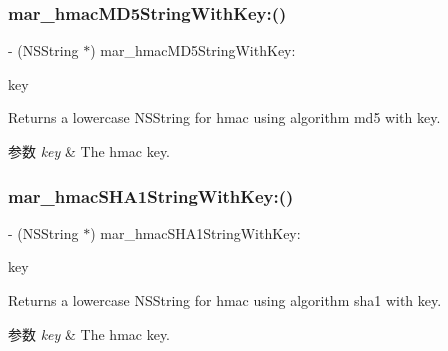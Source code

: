 \subsubsection{\texorpdfstring{mar\+\_\+hmac\+M\+D5\+String\+With\+Key\+:()}{mar\_hmacMD5StringWithKey:()}}
{\footnotesize\ttfamily -\/ (N\+S\+String $\ast$) mar\+\_\+hmac\+M\+D5\+String\+With\+Key\+: \begin{DoxyParamCaption}\item[{(N\+S\+String $\ast$)}]{key }\end{DoxyParamCaption}}

Returns a lowercase N\+S\+String for hmac using algorithm md5 with key. 
\begin{DoxyParams}{参数}
{\em key} & The hmac key. \\
\hline
\end{DoxyParams}
\mbox{\label{category_n_s_string_07_m_a_r_e_x_08_aa807fe24854e368144c8bd1068326a85}} 
\subsubsection{\texorpdfstring{mar\+\_\+hmac\+S\+H\+A1\+String\+With\+Key\+:()}{mar\_hmacSHA1StringWithKey:()}}
{\footnotesize\ttfamily -\/ (N\+S\+String $\ast$) mar\+\_\+hmac\+S\+H\+A1\+String\+With\+Key\+: \begin{DoxyParamCaption}\item[{(N\+S\+String $\ast$)}]{key }\end{DoxyParamCaption}}

Returns a lowercase N\+S\+String for hmac using algorithm sha1 with key. 
\begin{DoxyParams}{参数}
{\em key} & The hmac key. \\
\hline
\end{DoxyParams}
\mbox{\label{category_n_s_string_07_m_a_r_e_x_08_adb83ac231d3d660eae3a09e256ac896b}} 
